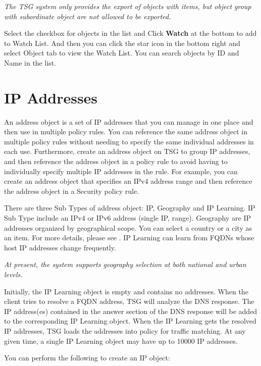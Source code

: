 \notemark\textit{The TSG system only provides the export of objects with items, but object group with subordinate object are not allowed to be exported.}


Select the checkbox for objects in the list and Click \textbf{Watch} at the bottom to add to Watch List. And then you can click the star icon in the bottom right and select Object tab to view the Watch List. You can search objects by ID and Name in the list.

\section*{\hypertarget{link:IP Addresses}{IP Addresses}}
\label{sec:objects:ip}

An address object is a set of IP addresses that you can manage in one place and then use in multiple policy rules. You can reference the same address object in multiple policy rules without needing to specify the same individual addresses in each use. Furthermore, create an address object on TSG to group IP addresses, and then reference the address object in a policy rule to avoid having to individually specify multiple IP addresses in the rule. For example, you can create an address object that specifies an IPv4 address range and then reference the address object in a Security policy rule. 


There are three Sub Types of address object: IP, Geography and IP Learning. IP Sub Type include an IPv4 or IPv6 address (single IP, range). Geography are IP addresses organized by geographical scope. You can select a country or a city as an item. For more details, please see \textbf{\hyperlink{link:IP Libraries}{\color{linkblue}{IP Libraries}}}. IP Learning can learn from FQDNs whose host IP addresses change frequently.


\notemark\textit{At present, the system supports geography selection at both national and urban levels.}


Initially, the IP Learning object is empty and contains no addresses. When the client tries to resolve a FQDN address, TSG will analyze the DNS response. The IP address(es) contained in the answer section of the DNS response will be added to the corresponding IP Learning object. When the IP Learning gets the resolved IP addresses, TSG loads the addresses into policy for traffic matching. At any given time, a single IP Learning object may have up to 10000 IP addresses.


You can perform the following to create an IP object:

